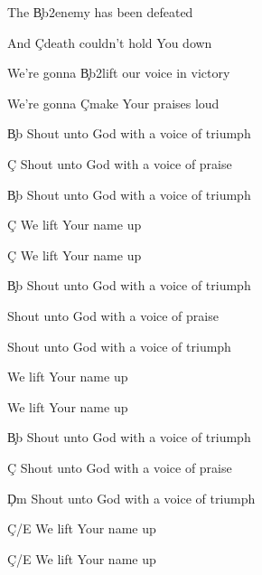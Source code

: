 \documentclass[9pt]{extarticle}
\begin{document}
\bsong

\bc
The \c{Bb2}enemy has been defeated

And \c{C}death couldn't hold You down

We're gonna \c{Bb2}lift our voice in victory

We're gonna \c{C}make Your praises loud
\ec

\bc
\c{Bb} Shout unto God with a voice of triumph

\c{C} Shout unto God with a voice of praise

\c{Bb} Shout unto God with a voice of triumph

\c{C} We lift Your name up

\c{C} We lift Your name up
\ec

\bc
\c{Bb} Shout unto God with a voice of triumph

Shout unto God with a voice of praise

Shout unto God with a voice of triumph

We lift Your name up

We lift Your name up
\ec

\bc
\c{Bb} Shout unto God with a voice of triumph

\c{C} Shout unto God with a voice of praise

\c{Dm} Shout unto God with a voice of triumph

\c{C/E} We lift Your name up

\c{C/E} We lift Your name up
\ec

\esong
\end{document}
